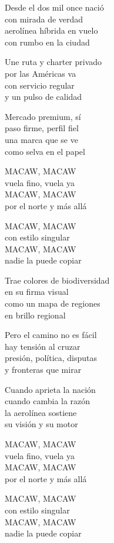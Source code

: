 \begin{lyrics}
Desde el dos mil once nació\\
con mirada de verdad\\
aerolínea híbrida en vuelo\\
con rumbo en la ciudad

Une ruta y charter privado\\
por las Américas va\\
con servicio regular\\
y un pulso de calidad

Mercado premium, sí\\
paso firme, perfil fiel\\
una marca que se ve\\
como selva en el papel

MACAW, MACAW\\
vuela fino, vuela ya\\
MACAW, MACAW\\
por el norte y más allá

MACAW, MACAW\\
con estilo singular\\
MACAW, MACAW\\
nadie la puede copiar

Trae colores de biodiversidad\\
en su firma visual\\
como un mapa de regiones\\
en brillo regional

Pero el camino no es fácil\\
hay tensión al cruzar\\
presión, política, disputas\\
y fronteras que mirar

Cuando aprieta la nación\\
cuando cambia la razón\\
la aerolínea sostiene\\
su visión y su motor

MACAW, MACAW\\
vuela fino, vuela ya\\
MACAW, MACAW\\
por el norte y más allá

MACAW, MACAW\\
con estilo singular\\
MACAW, MACAW\\
nadie la puede copiar


\end{lyrics}
